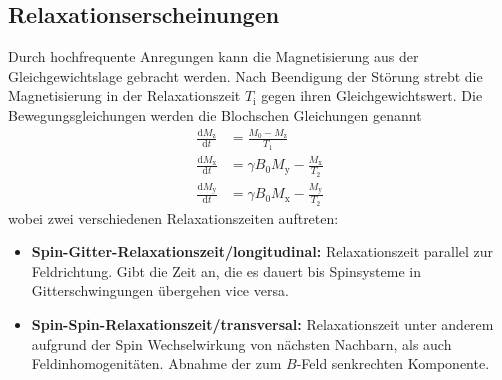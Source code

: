 \subsection{Relaxationserscheinungen}%
\label{sub:relaxationserscheinungen}
Durch hochfrequente Anregungen kann die Magnetisierung aus der
Gleichgewichtslage gebracht werden.
Nach Beendigung der Störung strebt die Magnetisierung in der Relaxationszeit
$T_\text{i}$ gegen ihren Gleichgewichtswert. 
Die Bewegungsgleichungen werden die Blochschen Gleichungen genannt
\begin{align}
		\frac{\text{d} M_\text{z}}{\text{d} t} &= \frac{M_0 - M_\text{z}}{T_1} \\
		\frac{\text{d} M_\text{x}}{\text{d} t} &= \gamma B_0 M_\text{y} -
		\frac{M_\text{x}}{T_2} \\               
		\frac{\text{d} M_\text{y}}{\text{d} t} &= \gamma B_0 M_\text{x} - \frac{M_\text{y}}{T_2} 
\end{align}
wobei zwei verschiedenen Relaxationszeiten auftreten:
\begin{itemize}
		\item \textbf{Spin-Gitter-Relaxationszeit/longitudinal:}
				Relaxationszeit parallel zur Feldrichtung. Gibt die Zeit
				an, die es dauert bis Spinsysteme in Gitterschwingungen
				übergehen vice versa. 
		\item \textbf{Spin-Spin-Relaxationszeit/transversal:} Relaxationszeit
				unter anderem aufgrund der Spin Wechselwirkung von nächsten
				Nachbarn, als auch Feldinhomogenitäten. Abnahme
				der zum $B$-Feld senkrechten Komponente.
\end{itemize}

